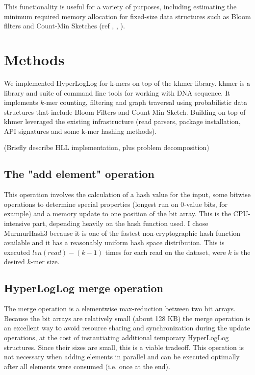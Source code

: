 \documentclass{bioinfo}
\begin{document}
This functionality is useful for a variety of purposes, including
estimating the minimum required memory allocation for fixed-size data
structures such as Bloom filters and Count-Min Sketches (ref \citep{pell2012scaling},
\citep{georganas2014parallel}, \citep{khmer-counting}).




\section{Methods}

We implemented HyperLogLog for k-mers on top of the khmer library.
khmer is a library and suite of command line tools for working with
DNA sequence.  It implements $k$-mer counting, filtering and graph
traversal using probabilistic data structures that include Bloom
Filters and Count-Min Sketch.  Building on top of khmer leveraged
the existing infrastructure (read parsers, package
installation, API signatures and some k-mer hashing methods).

(Briefly describe HLL implementation, plus problem decomposition)

\subsection{The "add element" operation}

This operation involves the calculation of a hash value for the input,
some bitwise operations to determine special properties (longest run on 0-value bits, for example)
and a memory update to one position of the bit array.
This is the CPU-intensive part,
depending heavily on the hash function used.
I chose MurmurHash3 because it is one of the fastest non-cryptographic hash function available
and it has a reasonably uniform hash space distribution.
This is executed $len(read) - (k-1)$ times for each read on the dataset,
were $k$ is the desired $k$-mer size.

\subsection{HyperLogLog merge operation}

The merge operation is a elementwise max-reduction between two bit arrays.
Because the bit arrays are relatively small (about 128 KB) the merge operation is an excellent way to avoid resource sharing and synchronization during the update operations,
at the cost of instantiating additional temporary HyperLogLog structures.
Since their sizes are small,
this is a viable tradeoff.
This operation is not necessary when adding elements in parallel and can be executed
optimally after all elements were consumed (i.e. once at the end).
\end{document}
